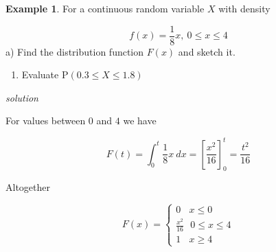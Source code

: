\documentclass[
]{book}
\providecommand{\tightlist}{%
  \setlength{\itemsep}{0pt}\setlength{\parskip}{0pt}}
\theoremstyle{definition}
\theoremstyle{definition}
\newtheorem{example}{Example}[chapter]
\theoremstyle{definition}
\theoremstyle{definition}
\theoremstyle{remark}
\begin{document}
\begin{example}
For a continuous random variable \(X\) with density

\[f(x) = \frac{1}{8}x, \ 0\leq x\leq 4\]
a) Find the distribution function \(F(x)\) and sketch it.

\begin{enumerate}
\def\labelenumi{\alph{enumi})}
\setcounter{enumi}{1}
\tightlist
\item
  Evaluate \(\text{P}(0.3\leq X\leq 1.8)\)
\end{enumerate}

\emph{solution}

For values between \(0\) and \(4\) we have

\[F(t) = \int_{0}^{t} \frac{1}{8}x \ dx = \left[ \frac{x^2}{16}\right]^{t}_{0}= \frac{t^2}{16}\]

Altogether

\begin{equation*}
  F(x)=\begin{cases}
        0 \ \ \ \ x\leq 0 \\
        \frac{x^2}{16} \ \ \   0\leq x \leq 4\\
        1 \ \ \ \ x\geq 4
  \end{cases}
\end{equation*}
\end{example}
\end{document}
